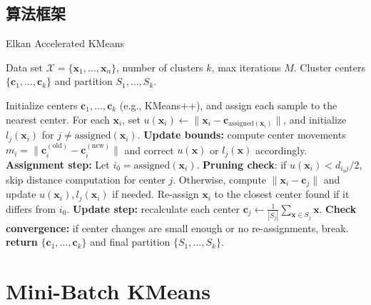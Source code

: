 \documentclass[12pt]{article}  %
\begin{document}
\subsection{算法框架}
\begin{algorithm}[H]
  \caption{Elkan Accelerated KMeans}
  \begin{algorithmic}[1]
  \Require Data set $\mathcal{X} = \{\mathbf{x}_1,\dots,\mathbf{x}_n\}$, number of clusters $k$, max iterations $M$.
  \Ensure Cluster centers $\{\boldsymbol{c}_1,\dots,\boldsymbol{c}_k\}$ and partition $S_1,\dots,S_k$.
  
  \vspace{6pt}
  \State Initialize centers $\boldsymbol{c}_1,\dots,\boldsymbol{c}_k$ (e.g., KMeans++), and assign each sample to the nearest center.
  \State For each $\mathbf{x}_i$, set $u(\mathbf{x}_i) \gets \|\mathbf{x}_i - \boldsymbol{c}_{\mathrm{assigned}(\mathbf{x}_i)}\|$, and initialize $l_j(\mathbf{x}_i)$ for $j \neq \mathrm{assigned}(\mathbf{x}_i)$.
      \State \textbf{Update bounds:} compute center movements $m_i = \|\boldsymbol{c}_i^{(\text{old})}-\boldsymbol{c}_i^{(\text{new})}\|$ and correct $u(\mathbf{x})$ or $l_j(\mathbf{x})$ accordingly.
      \State \textbf{Assignment step:}
              \State Let $i_0 = \mathrm{assigned}(\mathbf{x}_i)$.
                  \State \textbf{Pruning check}: if $u(\mathbf{x}_i) < d_{i_0 j} / 2$, skip distance computation for center $j$.
                  \State Otherwise, compute $\|\mathbf{x}_i - \boldsymbol{c}_j\|$ and update $u(\mathbf{x}_i), l_j(\mathbf{x}_i)$ if needed.
              \EndFor
              \State Re-assign $\mathbf{x}_i$ to the closest center found if it differs from $i_0$.
          \EndFor
      \State \textbf{Update step:} recalculate each center $\boldsymbol{c}_j \gets \frac{1}{|S_j|}\sum_{\mathbf{x}\in S_j}\mathbf{x}$.
      \State \textbf{Check convergence:} if center changes are small enough or no re-assignments, break.
  \EndFor
  \State \textbf{return} $\{\boldsymbol{c}_1,\dots,\boldsymbol{c}_k\}$ and final partition $\{S_1,\dots,S_k\}$.
  \end{algorithmic}
  \end{algorithm}

\section{Mini-Batch KMeans}
\end{document}
